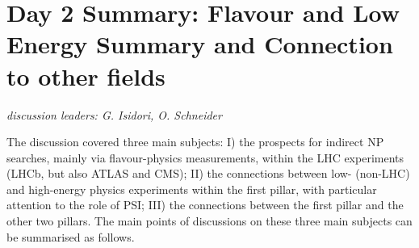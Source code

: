 \newpage
\section*{Day 2 Summary: Flavour and Low Energy Summary and Connection to other 
fields}\label{discussionconnetion}{\it discussion leaders: G. Isidori, O. Schneider}

\noindent The discussion covered three main subjects: I) the prospects for indirect NP searches, mainly via flavour-physics 
measurements, within the LHC experiments (LHCb, but also ATLAS and CMS);
II) the connections between low- (non-LHC) and high-energy physics experiments within the first pillar, with particular attention to the role of PSI;
III) the connections between the first pillar and the other two pillars.
The main points of discussions on these three main subjects can be summarised as follows.

